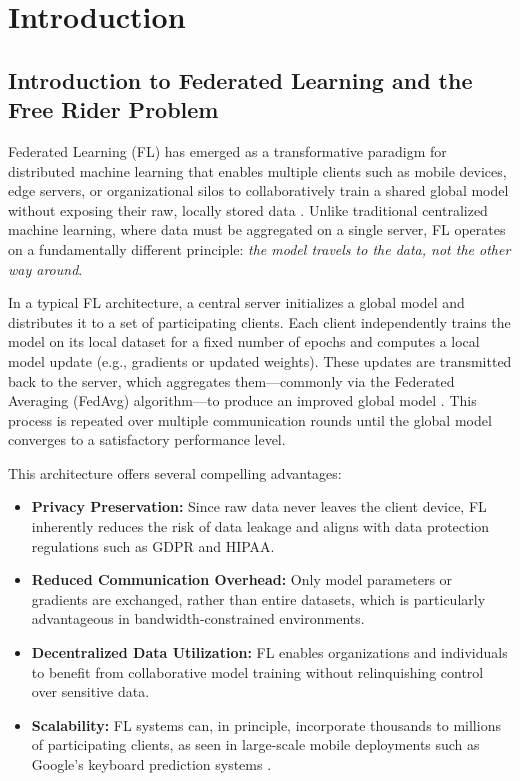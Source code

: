 \chapter{Introduction}


\section{Introduction to Federated Learning and the Free Rider Problem}
\label{sec:intro-info}

Federated Learning (FL) has emerged as a transformative paradigm for distributed machine learning that enables multiple clients such as mobile devices, edge servers, or organizational silos to collaboratively train a shared global model without exposing their raw, locally stored data \cite{mcmahan2017communication,kairouz2021advances}. Unlike traditional centralized machine learning, where data must be aggregated on a single server, FL operates on a fundamentally different principle: \emph{the model travels to the data, not the other way around}.

In a typical FL architecture, a central server initializes a global model and distributes it to a set of participating clients. Each client independently trains the model on its local dataset for a fixed number of epochs and computes a local model update (e.g., gradients or updated weights). These updates are transmitted back to the server, which aggregates them—commonly via the Federated Averaging (FedAvg) algorithm—to produce an improved global model \cite{mcmahan2017communication}. This process is repeated over multiple communication rounds until the global model converges to a satisfactory performance level.

This architecture offers several compelling advantages:

\begin{itemize}
    \item \textbf{Privacy Preservation:} Since raw data never leaves the client device, FL inherently reduces the risk of data leakage and aligns with data protection regulations such as GDPR and HIPAA.
    \item \textbf{Reduced Communication Overhead:} Only model parameters or gradients are exchanged, rather than entire datasets, which is particularly advantageous in bandwidth-constrained environments.
    \item \textbf{Decentralized Data Utilization:} FL enables organizations and individuals to benefit from collaborative model training without relinquishing control over sensitive data.
    \item \textbf{Scalability:} FL systems can, in principle, incorporate thousands to millions of participating clients, as seen in large-scale mobile deployments such as Google's keyboard prediction systems \cite{hard2018federated,bonawitz2019towards}.
\end{itemize}

